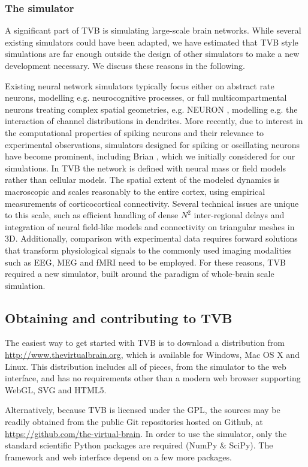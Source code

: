 \subsubsection{The simulator}

A significant part of TVB is simulating large-scale brain networks. While
several existing simulators could have been adapted, we have estimated that
TVB style simulations are far enough outside the design of other simulators to
make a new development necessary. We discuss these reasons in the following. 

Existing neural network simulators typically focus either on abstract rate neurons, 
modelling e.g. neurocognitive processes, or 
full multicompartmental neurons treating complex spatial
geometries, e.g. NEURON \cite{Hines_2001}, modelling e.g. the interaction of 
channel distributions in dendrites.  More recently, due to interest in
the computational properties of spiking neurons and their relevance to
experimental observations, simulators designed for spiking or oscillating neurons
have become prominent, including Brian \cite{Goodman_2009}, which we initially 
considered for our simulations.
In TVB the network is defined with neural mass or field
models \cite{Deco_2008a, Coombes_2010} rather than cellular models. The
spatial extent of the modeled dynamics is macroscopic and scales reasonably 
to the entire cortex, using empirical measurements of corticocortical
connectivity. Several technical issues are unique to this scale, such
as efficient handling of dense $N^2$ inter-regional delays and integration
of neural field-like models and connectivity on triangular meshes in 3D.
Additionally, comparison with experimental data requires forward solutions
that transform physiological signals to the commonly
used imaging modalities such as EEG, MEG and fMRI need to be employed.
For these reasons, TVB required a new simulator, built around the paradigm
of whole-brain scale simulation.

\subsection{Obtaining and contributing to TVB}

The easiest way to get started with TVB is to download a distribution
from \url{http://www.thevirtualbrain.org}, which is available for Windows,
Mac OS X and Linux. This distribution includes
all of pieces, from the simulator to the web interface, and has no
requirements other than a modern web browser supporting WebGL, SVG and
HTML5.

Alternatively, because TVB is licensed under the GPL, the sources may be
readily obtained from the public Git repositories hosted on Github, at 
\url{https://github.com/the-virtual-brain}. In order to use the simulator, 
only the standard scientific Python packages are required (NumPy \& SciPy).
The framework and web interface depend on a few more packages. 

